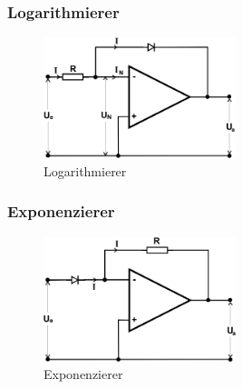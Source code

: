 \subsubsection{Logarithmierer}

\begin{figure}
	\centering
	\includegraphics[width=0.5\textwidth]{img/log.png}
	\caption{Logarithmierer \cite{v51}}
	\label{fig:log}
\end{figure}

\subsubsection{Exponenzierer}

\begin{figure}
	\centering
	\includegraphics[width=0.5\textwidth]{img/exp.png}
	\caption{Exponenzierer \cite{v51}}
	\label{fig:ep}
\end{figure}
